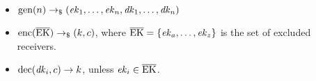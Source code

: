 \newcommand{\EK}{\overline{\mathrm{EK}}}   
\begin{itemize}
    \item $\mathrm{gen}(n)\to_\$(\mathit{ek}_1,\dots,\mathit{ek}_n,\mathit{dk}_1,\dots,\mathit{dk}_n)$
    \item $\enc(\EK)\tor(k, c)$, where $\EK=\{\ek_a,\dots,\ek_z\}$ is the set of excluded receivers.
    \item $\mathrm{dec}(\mathit{dk}_i, c)\to k$, unless $\ek_i\in\EK$.
\end{itemize}